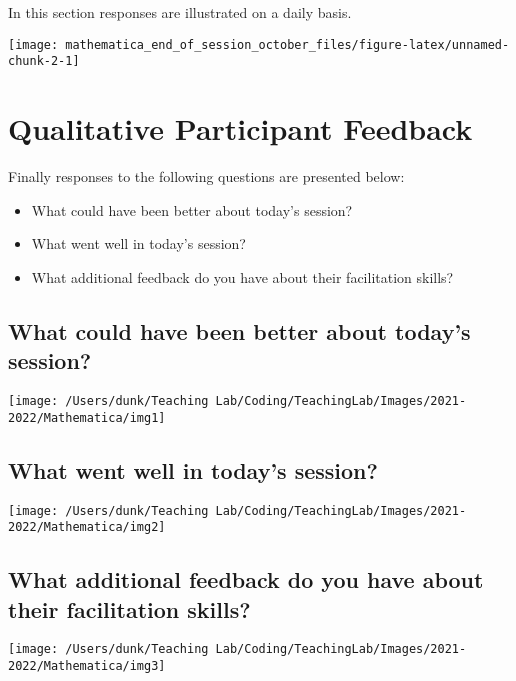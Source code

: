 \documentclass[10,a4paperpaper,]{article}
\begin{document}
In this section responses are illustrated on a daily basis.

\begin{center}\texttt{[image: mathematica\_end\_of\_session\_october\_files/figure-latex/unnamed-chunk-2-1]} \end{center}

\section{Qualitative Participant Feedback}

Finally responses to the following questions are presented below:

\begin{itemize}
\item
  What could have been better about today's session?
\item
  What went well in today's session?
\item
  What additional feedback do you have about their facilitation skills?
\end{itemize}

\subsection{What could have been better about today's session?}

\begin{center}\texttt{[image: /Users/dunk/Teaching Lab/Coding/TeachingLab/Images/2021-2022/Mathematica/img1]} \end{center}

\subsection{What went well in today's session?}

\begin{center}\texttt{[image: /Users/dunk/Teaching Lab/Coding/TeachingLab/Images/2021-2022/Mathematica/img2]} \end{center}

\subsection{What additional feedback do you have about their facilitation skills?}

\begin{center}\texttt{[image: /Users/dunk/Teaching Lab/Coding/TeachingLab/Images/2021-2022/Mathematica/img3]} \end{center}
\end{document}
